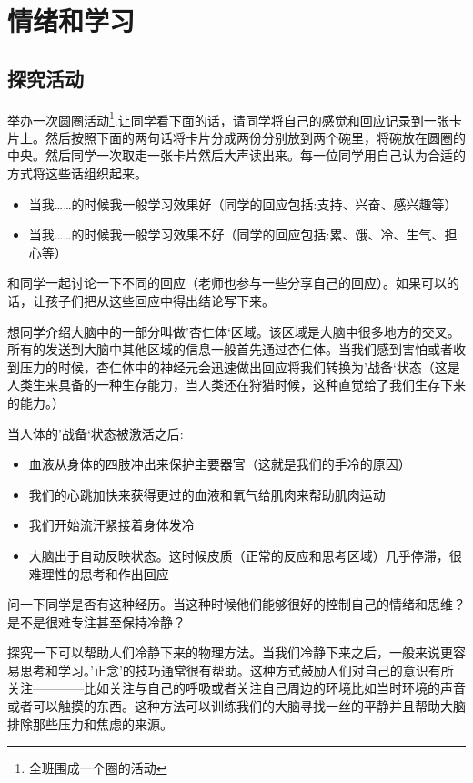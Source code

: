 \chapter{情绪和学习}


\section{探究活动}
   举办一次圆圈活动\footnote{全班围成一个圈的活动}.让同学看下面的话，请同学将自己的感觉和回应记录到一张卡片上。然后按照下面的两句话将卡片分成两份分别放到两个碗里，将碗放在圆圈的中央。然后同学一次取走一张卡片然后大声读出来。每一位同学用自己认为合适的方式将这些话组织起来。\par
   \begin{itemize}
     \item 当我……的时候我一般学习效果好（同学的回应包括:支持、兴奋、感兴趣等）
     \item 当我……的时候我一般学习效果不好（同学的回应包括:累、饿、冷、生气、担心等）
   \end{itemize}  
   和同学一起讨论一下不同的回应（老师也参与一些分享自己的回应）。如果可以的话，让孩子们把从这些回应中得出结论写下来。\par
   想同学介绍大脑中的一部分叫做’杏仁体‘区域。该区域是大脑中很多地方的交叉。所有的发送到大脑中其他区域的信息一般首先通过杏仁体。当我们感到害怕或者收到压力的时候，杏仁体中的神经元会迅速做出回应将我们转换为’战备‘状态（这是人类生来具备的一种生存能力，当人类还在狩猎时候，这种直觉给了我们生存下来的能力。）\par
   当人体的’战备‘状态被激活之后:\par
   \begin{itemize}
     \item 血液从身体的四肢冲出来保护主要器官（这就是我们的手冷的原因）
     \item 我们的心跳加快来获得更过的血液和氧气给肌肉来帮助肌肉运动
     \item 我们开始流汗紧接着身体发冷
     \item 大脑出于自动反映状态。这时候皮质（正常的反应和思考区域）几乎停滞，很难理性的思考和作出回应
   \end{itemize}  
   问一下同学是否有这种经历。当这种时候他们能够很好的控制自己的情绪和思维？是不是很难专注甚至保持冷静？\par
   探究一下可以帮助人们冷静下来的物理方法。当我们冷静下来之后，一般来说更容易思考和学习。'正念'的技巧通常很有帮助。这种方式鼓励人们对自己的意识有所关注————比如关注与自己的呼吸或者关注自己周边的环境比如当时环境的声音或者可以触摸的东西。这种方法可以训练我们的大脑寻找一丝的平静并且帮助大脑排除那些压力和焦虑的来源。\par
